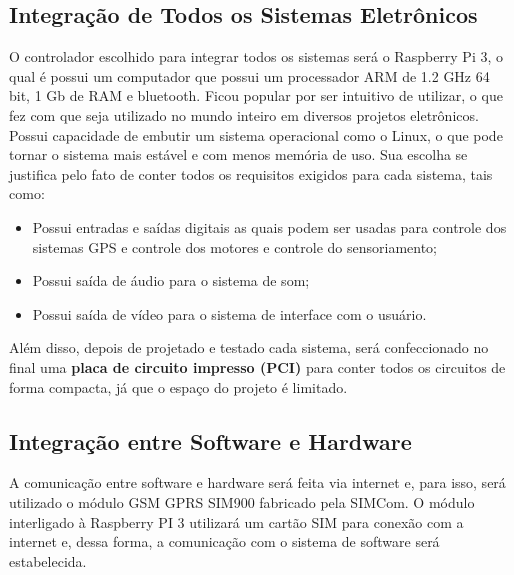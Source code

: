 \subsection{Integração de Todos os Sistemas Eletrônicos}

O controlador escolhido para integrar todos os sistemas será o Raspberry Pi 3, o qual é possui um computador que possui um processador ARM de 1.2 GHz 64 bit, 1 Gb de RAM e bluetooth. Ficou popular por ser intuitivo de utilizar, o que fez com que seja utilizado no mundo inteiro em diversos projetos eletrônicos. Possui capacidade de embutir um sistema operacional como o Linux, o que pode tornar o sistema mais estável e com menos memória de uso. Sua escolha se justifica pelo fato de conter todos os requisitos exigidos para cada sistema, tais como:

\begin{itemize}
  \item Possui entradas e saídas digitais as quais podem ser usadas para controle dos sistemas GPS e controle dos motores e controle do sensoriamento;
  \item Possui saída de áudio para o sistema de som;
  \item Possui saída de vídeo para o sistema de interface com o usuário.
\end{itemize}

Além disso, depois de projetado e testado cada sistema, será confeccionado no final uma \textbf{placa de circuito impresso (PCI)} para conter todos os circuitos de forma compacta, já que o espaço do projeto é limitado.

\subsection{Integração entre Software e Hardware}
A comunicação entre software e hardware será feita via internet e, para isso, será utilizado o módulo GSM GPRS SIM900 fabricado pela SIMCom. O módulo interligado à Raspberry PI 3 utilizará um cartão SIM para conexão com a internet e, dessa forma, a comunicação com o sistema de software será estabelecida.


